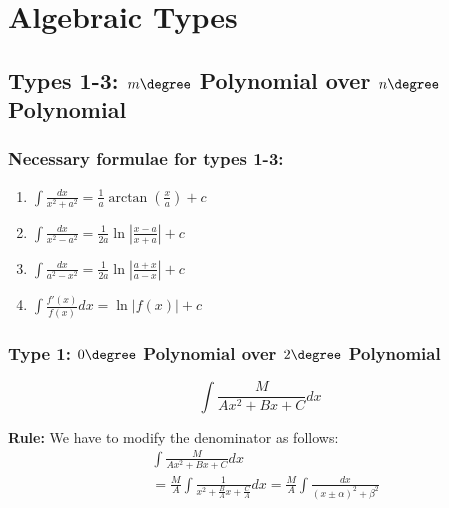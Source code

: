 \section{Algebraic Types}
  \subsection{Types 1-3: $m\degree$ Polynomial over $n\degree$ Polynomial}
    \subsubsection{Necessary formulae for types 1-3:}
      \begin{enumerate}
        \item $\int \frac{dx}{x^2 + a^2} = \frac{1}{a} \arctan(\frac{x}{a}) + c$
        \item $\int \frac{dx}{x^2 - a^2}= \frac{1}{2a} \ln |\frac{x-a}{x+a}| + c$
        \item $\int \frac{dx}{a^2 - x^2} = \frac{1}{2a} \ln |\frac{a+x}{a-x}| + c$
        \item $\int \frac{f'(x)}{f(x)} dx = \ln |f(x)| + c$
      \end{enumerate}

    \subsubsection{Type 1: $0\degree$ Polynomial over $2\degree$ Polynomial}
      
      \begin{equation*}
        \int \frac{M}{Ax^2 + Bx + C} dx
      \end{equation*}
      
      \begin{center}
        \textbf{Rule:} We have to modify the denominator as follows: \begin{align*}
          & \int \frac{M}{Ax^2 + Bx + C} dx \\
          & = \frac{M}{A} \int \frac{1}{x^2 + \frac{B}{A} x + \frac{C}{A}} dx
          = \frac{M}{A} \int \frac{dx}{(x \pm \alpha)^2 + \beta^2}
        \end{align*}
      \end{center}
      
